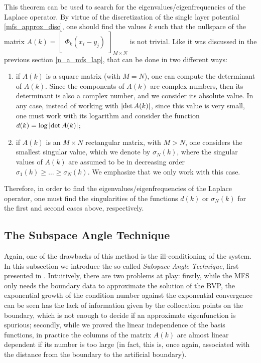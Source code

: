 This theorem can be used to search for the eigenvalues/eigenfrequencies of the Laplace operator. By virtue of the discretization of the single layer potential \eqref{mfs_approx_disc}, one should find the values \(k\) such that the nullspace of the matrix \(A(k) = \begin{bmatrix}
    \Phi_k(x_i - y_j)
\end{bmatrix}_{M \times N}\) is not trivial. Like it was discussed in the previous section \ref{n_a_mfs_lap}, that can be done in two different ways:
\begin{enumerate}
    \item if \(A(k)\) is a square matrix (with \(M=N\)), one can compute the determinant of \(A(k)\). Since the components of \(A(k)\) are complex numbers, then its determinant is also a complex number, and we consider its absolute value. In any case, instead of working with \(\abs{\determinant A(k)}\), since this value is very small, one must work with its logarithm and consider the function \(d(k) = \log \abs{\determinant A(k)}\);
    \item if \(A(k)\) is an \(M\times N\) rectangular matrix, with \(M > N\), one considers the smallest singular value, which we denote by \(\sigma_N(k)\), where the singular values of \(A(k)\) are assumed to be in decreasing order \(\sigma_1(k) \geq \dots \geq \sigma_N(k)\). We emphasize that we only work with this case.
\end{enumerate}
Therefore, in order to find the eigenvalues/eigenfrequencies of the Laplace operator, one must find the singularities of the functions \(d(k)\) or \(\sigma_N(k)\) for the first and second cases above, respectively.

\subsection{The Subspace Angle Technique}

Again, one of the drawbacks of this method is the ill-conditioning of the system. In this subsection we introduce the so-called \textit{Subspace Angle Technique}, first presented in \cite{betcke2005reviving}. Intuitively, there are two problems at play: firstly, while the MFS only needs the boundary data to approximate the solution of the BVP, the exponential growth of the condition number against the exponential convergence can be seen has the lack of information given by the collocation points on the boundary, which is not enough to decide if an approximate eigenfunction is spurious; secondly, while we proved the linear independence of the basis functions, in practice the columns of the matrix \(A(k)\) are almost linear dependent if its number is too large (in fact, this is, once again, associated with the distance from the boundary to the artificial boundary).

